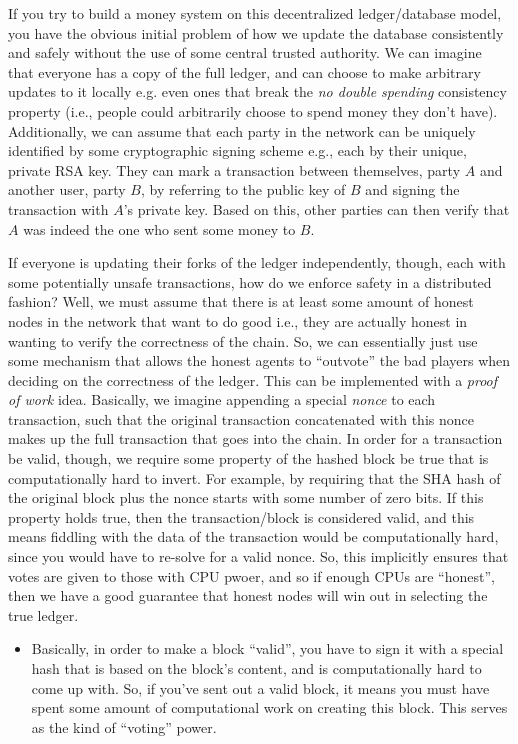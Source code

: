 \documentclass[10pt,a4paper]{article}
\begin{document}
If you try to build a money system on this decentralized ledger/database model, you have the obvious initial problem of how we update the database consistently and safely without the use of some central trusted authority. We can imagine that everyone has a copy of the full ledger, and can choose to make arbitrary updates to it locally e.g. even ones that break the \textit{no double spending} consistency property (i.e., people could arbitrarily choose to spend money they don't have). Additionally, we can assume that each party in the network can be uniquely identified by some cryptographic signing scheme e.g., each by their unique, private RSA key. They can mark a transaction between themselves, party $A$ and another user, party $B$, by referring to the public key of $B$ and signing the transaction with $A$'s private key. Based on this, other parties can then verify that $A$ was indeed the one who sent some money to $B$.

If everyone is updating their forks of the ledger independently, though, each with some potentially unsafe transactions, how do we enforce safety in a distributed fashion? Well, we must assume that there is at least some amount of honest nodes in the network that want to do good i.e., they are actually honest in wanting to verify the correctness of the chain. So, we can essentially just use some mechanism that allows the honest agents to ``outvote'' the bad players when deciding on the correctness of the ledger. This can be implemented with a \textit{proof of work} idea. Basically, we imagine appending a special \textit{nonce} to each transaction, such that the original transaction concatenated with this nonce makes up the full transaction that goes into the chain. In order for a transaction be valid, though, we require some property of the hashed block be true that is computationally hard to invert. For example, by requiring that the SHA hash of the original block plus the nonce starts with some number of zero bits. If this property holds true, then the transaction/block is considered valid, and this means fiddling with the data of the transaction would be computationally hard, since you would have to re-solve for a valid nonce. So, this implicitly ensures that votes are given to those with CPU pwoer, and so if enough CPUs are ``honest'', then we have a good guarantee that honest nodes will win out in selecting the true ledger. 

\begin{itemize}
    \item Basically, in order to make a block ``valid'', you have to sign it with a special hash that is based on the block's content, and is computationally hard to come up with. So, if you've sent out a valid block, it means you must have spent some amount of computational work on creating this block. This serves as the kind of ``voting'' power.
\end{itemize}
\end{document}
